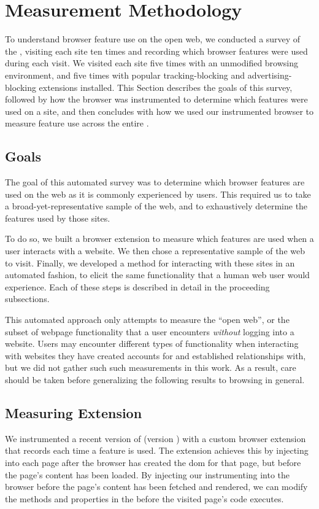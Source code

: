 \section{Measurement Methodology}
\label{measurement:methodology}

To understand browser feature use on the open web, we conducted a survey of the
\ATK, visiting each site ten times and recording which browser features
were used during each visit.  We visited each site five times with an
unmodified browsing environment, and five times with popular tracking-blocking
and advertising-blocking extensions installed.  This Section describes the
goals of this survey, followed by how the browser was instrumented to determine
which features were used on a site, and then concludes with how we used
our instrumented browser to measure feature use across the entire \ATK.


\subsection{Goals}
The goal of this automated survey was to determine which browser features
are used on the web as it is commonly experienced by users.  This required us
to take a broad-yet-representative sample of the web, and to exhaustively
determine the features used by those sites.

To do so, we built a browser extension to measure which features are used when
a user interacts with a website.  We then chose a representative sample of the
web to visit.  Finally, we developed a method for interacting with these sites
in an automated fashion, to elicit the same functionality that a human web user
would experience.  Each of these steps is described in detail in the proceeding
subsections.

This automated approach only attempts to measure the ``open web'', or the
subset of webpage functionality that a user encounters \textit{without} logging
into a website.  Users may encounter different types of functionality when
interacting with websites they have created accounts for and established
relationships with, but we did not gather such such measurements in
this work.  As a result, care should be taken before generalizing the following
results to browsing in general.


\subsection{Measuring Extension}
\label{measurement:methodology:measureextension}
We instrumented a recent version of \FF (version \FFversion) with a custom
browser extension that records each time a \JS feature is used.  The extension
achieves this by injecting \JS into each page after the browser has created the
\gls{dom} for that page, but before the page's content has been loaded. By
injecting our instrumenting \JS into the browser before the page's content has
been fetched and rendered, we can modify the methods and properties in the
\WAPI before the visited page's code executes.

